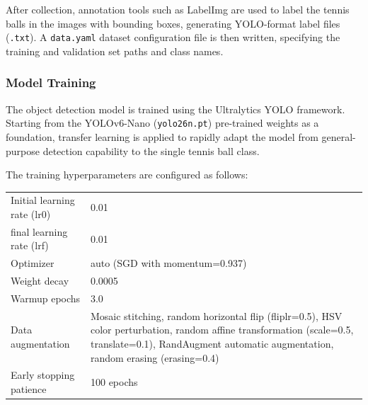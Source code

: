 After collection, annotation tools such as LabelImg are used to label the tennis balls in the images with bounding boxes, generating YOLO-format label files (\texttt{.txt}). A \texttt{data.yaml} dataset configuration file is then written, specifying the training and validation set paths and class names.

\subsubsection{Model Training}
\label{sec:cv:training}

The object detection model is trained using the Ultralytics YOLO framework. Starting from the YOLOv6-Nano (\texttt{yolo26n.pt}) pre-trained weights as a foundation, transfer learning is applied to rapidly adapt the model from general-purpose detection capability to the single tennis ball class.

The training hyperparameters are configured as follows:

\begin{tabularx}{0.8\linewidth}{lX}
  Initial learning rate (lr0) & 0.01 \\
  final learning rate (lrf) & 0.01 \\
  Optimizer & auto (SGD with momentum=0.937) \\
  Weight decay & 0.0005 \\
  Warmup epochs & 3.0 \\
  Data augmentation & Mosaic stitching, random horizontal flip (fliplr=0.5), HSV color perturbation, random affine transformation (scale=0.5, translate=0.1), RandAugment automatic augmentation, random erasing (erasing=0.4) \\
  Early stopping patience & 100 epochs
\end{tabularx}


